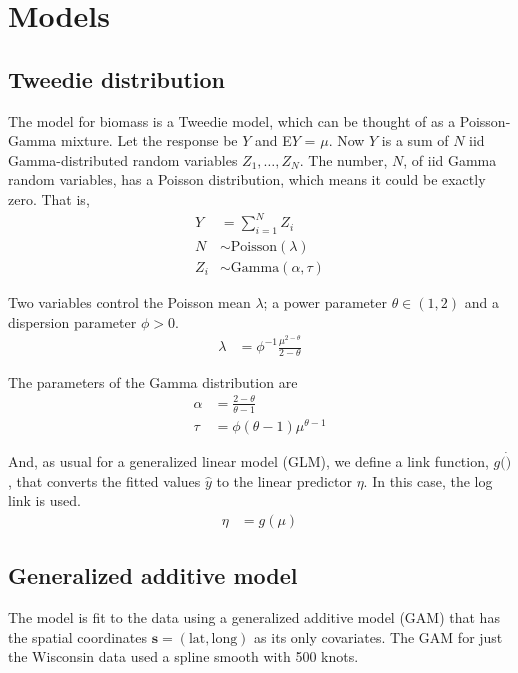 \documentclass[authoryear, review, 11pt]{elsarticle}
\begin{document}
\section{Models}

\subsection{Tweedie distribution}

The model for biomass is a Tweedie model, which can be thought of as a Poisson-Gamma mixture. Let the response be $Y$ and E$Y$ = $\mu$. Now $Y$ is a sum of $N$ iid Gamma-distributed random variables $Z_1, \dots, Z_N$. The number, $N$, of iid Gamma random variables, has a Poisson distribution, which means it could be exactly zero. That is,
\begin{align*}
    Y &= \sum\limits_{i=1}^N Z_i \\
    N &\sim \text{Poisson}(\lambda) \\
    Z_i &\sim \text{Gamma}(\alpha, \tau)
\end{align*}

Two variables control the Poisson mean $\lambda$; a power parameter $\theta \in (1,2)$ and a dispersion parameter $\phi > 0$.
\begin{align*}
    \lambda &= \phi^{-1} \frac{\mu^{2-\theta}}{2-\theta}
\end{align*}

The parameters of the Gamma distribution are
\begin{align*}
    \alpha &= \frac{2-\theta}{\theta-1} \\
    \tau &= \phi (\theta - 1) \mu^{\theta - 1}
\end{align*}

And, as usual for a generalized linear model (GLM), we define a link function, $g(\dot)$, that converts the fitted values $\hat{y}$ to the linear predictor $\eta$. In this case, the log link is used.
\begin{align*}
    \eta &= g\left(\mu\right)
\end{align*}

\subsection{Generalized additive model}
The model is fit to the data using a generalized additive model (GAM) that has the spatial coordinates $\bm{s} = (\text{lat}, \text{long})$ as its only covariates. The GAM for just the Wisconsin data used a spline smooth with 500 knots. 
\end{document}
